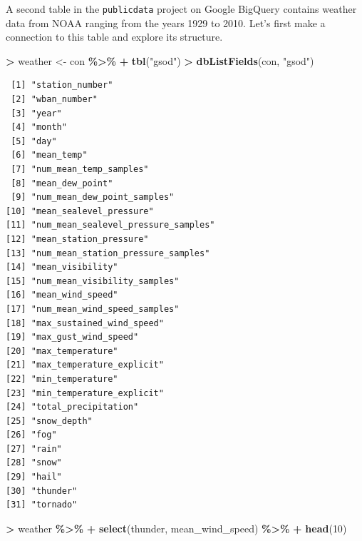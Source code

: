 \documentclass[
]{krantz}
\makeatletter
\newenvironment{Shaded}{\begin{snugshade}}{\end{snugshade}}
\newcommand{\DecValTok}[1]{\textcolor[rgb]{0.06,0.06,0.06}{#1}}
\newcommand{\KeywordTok}[1]{\textcolor[rgb]{0.27,0.27,0.27}{\textbf{#1}}}
\newcommand{\NormalTok}[1]{#1}
\newcommand{\OperatorTok}[1]{\textcolor[rgb]{0.43,0.43,0.43}{\textbf{#1}}}
\newcommand{\StringTok}[1]{\textcolor[rgb]{0.5,0.5,0.5}{#1}}
\newenvironment{kframe}{%
\medskip{}
\setlength{\fboxsep}{.8em}
 \def\at@end@of@kframe{}%
 \ifinner\ifhmode%
  \def\at@end@of@kframe{\end{minipage}}%
  \begin{minipage}{\columnwidth}%
 \fi\fi%
 \def\FrameCommand##1{\hskip\@totalleftmargin \hskip-\fboxsep
 \colorbox{shadecolor}{##1}\hskip-\fboxsep
     \hskip-\linewidth \hskip-\@totalleftmargin \hskip\columnwidth}%
 \MakeFramed {\advance\hsize-\width
   \@totalleftmargin\z@ \linewidth\hsize
   \@setminipage}}%
 {\par\unskip\endMakeFramed%
 \at@end@of@kframe}
\renewenvironment{Shaded}{\begin{kframe}}{\end{kframe}}
\makeatother
\begin{document}
A second table in the \texttt{publicdata} project on Google BigQuery contains weather data from NOAA ranging from the years 1929 to 2010. Let's first make a connection to this table and explore its structure.

\begin{Shaded}
\begin{Highlighting}[]
\OperatorTok{\textgreater{}}\StringTok{ }\NormalTok{weather \textless{}{-}}\StringTok{ }\NormalTok{con }\OperatorTok{\%\textgreater{}\%}
\OperatorTok{+}\StringTok{   }\KeywordTok{tbl}\NormalTok{(}\StringTok{"gsod"}\NormalTok{)}
\OperatorTok{\textgreater{}}\StringTok{ }\KeywordTok{dbListFields}\NormalTok{(con, }\StringTok{"gsod"}\NormalTok{)}
\end{Highlighting}
\end{Shaded}

\begin{verbatim}
 [1] "station_number"                    
 [2] "wban_number"                       
 [3] "year"                              
 [4] "month"                             
 [5] "day"                               
 [6] "mean_temp"                         
 [7] "num_mean_temp_samples"             
 [8] "mean_dew_point"                    
 [9] "num_mean_dew_point_samples"        
[10] "mean_sealevel_pressure"            
[11] "num_mean_sealevel_pressure_samples"
[12] "mean_station_pressure"             
[13] "num_mean_station_pressure_samples" 
[14] "mean_visibility"                   
[15] "num_mean_visibility_samples"       
[16] "mean_wind_speed"                   
[17] "num_mean_wind_speed_samples"       
[18] "max_sustained_wind_speed"          
[19] "max_gust_wind_speed"               
[20] "max_temperature"                   
[21] "max_temperature_explicit"          
[22] "min_temperature"                   
[23] "min_temperature_explicit"          
[24] "total_precipitation"               
[25] "snow_depth"                        
[26] "fog"                               
[27] "rain"                              
[28] "snow"                              
[29] "hail"                              
[30] "thunder"                           
[31] "tornado"                           
\end{verbatim}

\begin{Shaded}
\begin{Highlighting}[]
\OperatorTok{\textgreater{}}\StringTok{ }\NormalTok{weather }\OperatorTok{\%\textgreater{}\%}
\OperatorTok{+}\StringTok{   }\KeywordTok{select}\NormalTok{(thunder, mean\_wind\_speed) }\OperatorTok{\%\textgreater{}\%}
\OperatorTok{+}\StringTok{   }\KeywordTok{head}\NormalTok{(}\DecValTok{10}\NormalTok{)}
\end{Highlighting}
\end{Shaded}
\end{document}

